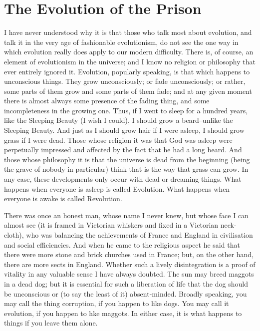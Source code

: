 \documentclass{book}
\begin{document}
\chapter{The Evolution of the Prison}
\label{chapter-6}
I have never understood why it is that those who talk most about evolution, and talk it in the very age of fashionable evolutionism, do not see the one way in which evolution really does apply to our modern difficulty. There is, of course, an element of evolutionism in the universe; and I know no religion or philosophy that ever entirely ignored it. Evolution, popularly speaking, is that which happens to unconscious things. They grow unconsciously; or fade unconsciously; or rather, some parts of them grow and some parts of them fade; and at any given moment there is almost always some presence of the fading thing, and some incompleteness in the growing one. Thus, if I went to sleep for a hundred years, like the Sleeping Beauty (I wish I could), I should grow a beard–unlike the Sleeping Beauty. And just as I should grow hair if I were asleep, I should grow grass if I were dead. Those whose religion it was that God was asleep were perpetually impressed and affected by the fact that he had a long beard. And those whose philosophy it is that the universe is dead from the beginning (being the grave of nobody in particular) think that is the way that grass can grow. In any case, these developments only occur with dead or dreaming things. What happens when everyone is asleep is called Evolution. What happens when everyone is awake is called Revolution.

There was once an honest man, whose name I never knew, but whose face I can almost see (it is framed in Victorian whiskers and fixed in a Victorian neck-cloth), who was balancing the achievements of France and England in civilisation and social efficiencies. And when he came to the religious aspect he said that there were more stone and brick churches used in France; but, on the other hand, there are more sects in England. Whether such a lively disintegration is a proof of vitality in any valuable sense I have always doubted. The sun may breed maggots in a dead dog; but it is essential for such a liberation of life that the dog should be unconscious or (to say the least of it) absent-minded. Broadly speaking, you may call the thing corruption, if you happen to like dogs. You may call it evolution, if you happen to hke maggots. In either case, it is what happens to things if you leave them alone.
\end{document}
